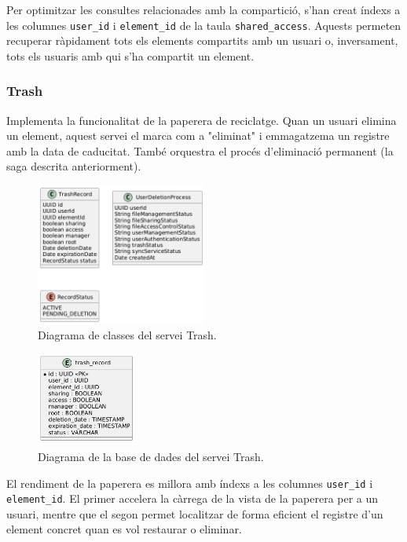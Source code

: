 Per optimitzar les consultes relacionades amb la compartició, s'han creat índexs a les columnes \texttt{user\_id} i \texttt{element\_id} de la taula \texttt{shared\_access}. Aquests permeten recuperar ràpidament tots els elements compartits amb un usuari o, inversament, tots els usuaris amb qui s'ha compartit un element.

\subsubsection{Trash}
Implementa la funcionalitat de la paperera de reciclatge. Quan un usuari elimina un element, aquest servei el marca com a "eliminat" i emmagatzema un registre amb la data de caducitat. També orquestra el procés d'eliminació permanent (la saga descrita anteriorment).

\begin{figure}[H]
    \centering
    \includegraphics[width=0.5\textwidth]{Figures/diagrama_clases_Trash.png}
    \caption{Diagrama de classes del servei Trash.}
    \label{fig:trash_classes}
\end{figure}

\begin{figure}[H]
    \centering
    \includegraphics[width=0.3\textwidth]{Figures/diagrama_bd_trash.png}
    \caption{Diagrama de la base de dades del servei Trash.}
    \label{fig:trash_db}
\end{figure}

El rendiment de la paperera es millora amb índexs a les columnes \texttt{user\_id} i \texttt{element\_id}. El primer accelera la càrrega de la vista de la paperera per a un usuari, mentre que el segon permet localitzar de forma eficient el registre d'un element concret quan es vol restaurar o eliminar.

